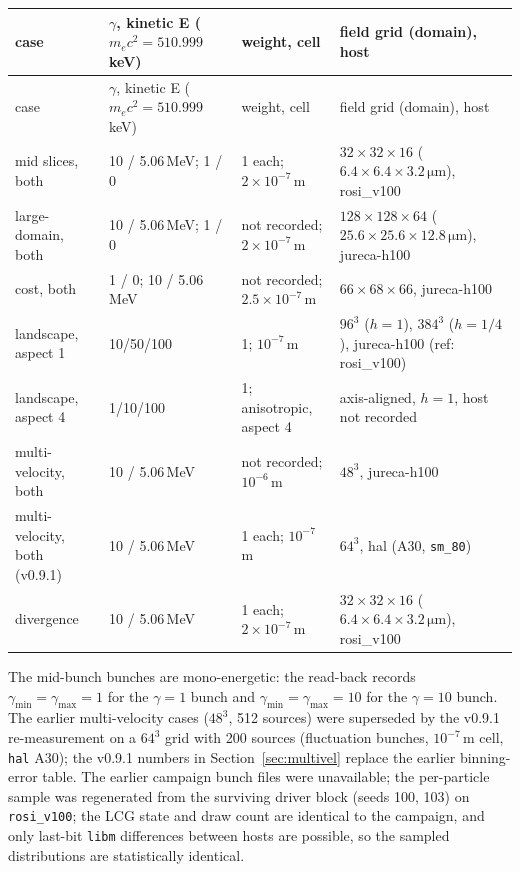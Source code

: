 \begin{table}[t]
\begin{longtable}{@{}p{2.3cm}p{3.4cm}p{4.5cm}p{4.4cm}@{}}
\toprule
case & $\gamma$, kinetic E ($m_ec^2\!=\!510.999$\,keV) & weight, cell & field grid (domain), host \\
\midrule
\endfirsthead
\toprule
case & $\gamma$, kinetic E ($m_ec^2\!=\!510.999$\,keV) & weight, cell & field grid (domain), host \\
\midrule
\endhead
\bottomrule
\endfoot
mid slices, both & 10 / 5.06\,MeV; 1 / 0 & 1 each; $2\times10^{-7}$\,m & $32\times32\times16$ ($6.4\times6.4\times3.2\,\si{\micro\metre}$), rosi\_v100 \\
large-domain, both & 10 / 5.06\,MeV; 1 / 0 & not recorded; $2\times10^{-7}$\,m & $128\times128\times64$ ($25.6\times25.6\times12.8\,\si{\micro\metre}$), jureca-h100 \\
cost, both & 1 / 0; 10 / 5.06\,MeV & not recorded; $2.5\times10^{-7}$\,m & $66\times68\times66$, jureca-h100 \\
landscape, aspect 1 & 10/50/100 & 1; $10^{-7}$\,m & $96^3$ ($h\!=\!1$), $384^3$ ($h\!=\!1/4$), jureca-h100 (ref: rosi\_v100) \\
landscape, aspect 4 & 1/10/100 & 1; anisotropic, aspect 4 & axis-aligned, $h\!=\!1$, host not recorded \\
 multi-velocity, both & 10 / 5.06\,MeV & not recorded; $10^{-6}$\,m & $48^3$, jureca-h100 \\
 multi-velocity, both (v0.9.1) & 10 / 5.06\,MeV & 1 each; $10^{-7}$\,m & $64^3$, hal (A30, \texttt{sm\_80}) \\
 divergence & 10 / 5.06\,MeV & 1 each; $2\times10^{-7}$\,m & $32\times32\times16$ ($6.4\times6.4\times3.2\,\si{\micro\metre}$), rosi\_v100 \\
\end{longtable}
\end{table}

The mid-bunch bunches are mono-energetic: the read-back records
$\gamma_{\min}=\gamma_{\max}=1$ for the $\gamma=1$ bunch and
$\gamma_{\min}=\gamma_{\max}=10$ for the $\gamma=10$ bunch.
The earlier multi-velocity cases ($48^3$, 512 sources) were
superseded by the v0.9.1 re-measurement on a $64^3$ grid with 200 sources
(fluctuation bunches, $10^{-7}$\,m cell, \texttt{hal} A30); the v0.9.1
numbers in Section~\ref{sec:multivel} replace the earlier binning-error
table. The earlier campaign bunch files were unavailable; the per-particle
sample was regenerated from the surviving driver block (seeds 100, 103) on
\texttt{rosi\_v100}; the LCG state
and draw count are identical to the campaign, and only last-bit
\texttt{libm} differences between hosts are possible, so the sampled
distributions are statistically identical.
